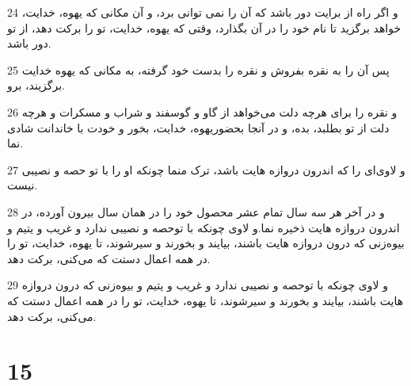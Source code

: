 \par 24 و اگر راه از برایت دور باشد که آن را نمی توانی برد، و آن مکانی که یهوه، خدایت، خواهد برگزید تا نام خود را در آن بگذارد، وقتی که یهوه، خدایت، تو را برکت دهد، از تو دور باشد.
\par 25 پس آن را به نقره بفروش و نقره را بدست خود گرفته، به مکانی که یهوه خدایت برگزیند، برو.
\par 26 و نقره را برای هرچه دلت می‌خواهد از گاو و گوسفند و شراب و مسکرات و هرچه دلت از تو بطلبد، بده، و در آنجا بحضوریهوه، خدایت، بخور و خودت با خاندانت شادی نما.
\par 27 و لاوی‌ای را که اندرون دروازه هایت باشد، ترک منما چونکه او را با تو حصه و نصیبی نیست.
\par 28 و در آخر هر سه سال تمام عشر محصول خود را در همان سال بیرون آورده، در اندرون دروازه هایت ذخیره نما.و لاوی چونکه با توحصه و نصیبی ندارد و غریب و یتیم و بیوه‌زنی که درون دروازه هایت باشند، بیایند و بخورند و سیرشوند، تا یهوه، خدایت، تو را در همه اعمال دستت که می‌کنی، برکت دهد.
\par 29 و لاوی چونکه با توحصه و نصیبی ندارد و غریب و یتیم و بیوه‌زنی که درون دروازه هایت باشند، بیایند و بخورند و سیرشوند، تا یهوه، خدایت، تو را در همه اعمال دستت که می‌کنی، برکت دهد.
 
\chapter{15}

